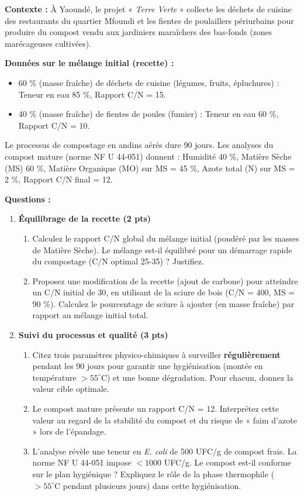 \documentclass[11pt]{article}
\begin{document}
\begin{exercice}
\textbf{Contexte :} À Yaoundé, le projet « \emph{Terre Verte} » collecte les déchets de cuisine des restaurants du quartier Mfoundi et les fientes de poulaillers périurbains pour produire du compost vendu aux jardiniers maraîchers des bas-fonds (zones marécageuses cultivées).

\textbf{Données sur le mélange initial (recette) :}
\begin{itemize}
    \item 60 \% (masse fraîche) de déchets de cuisine (légumes, fruits, épluchures) : Teneur en eau 85 \%, Rapport C/N = 15.
    \item 40 \% (masse fraîche) de fientes de poules (fumier) : Teneur en eau 60 \%, Rapport C/N = 10.
\end{itemize}
Le processus de compostage en andins aérés dure 90 jours. Les analyses du compost mature (norme NF U 44-051) donnent : Humidité 40 \%, Matière Sèche (MS) 60 \%, Matière Organique (MO) sur MS = 45 \%, Azote total (N) sur MS = 2 \%, Rapport C/N final = 12.

\textbf{Questions :}

\begin{enumerate}
    \item \textbf{Équilibrage de la recette (2 pts)}
    \begin{enumerate}
        \item Calculez le rapport C/N global du mélange initial (pondéré par les masses de Matière Sèche). Le mélange est-il équilibré pour un démarrage rapide du compostage (C/N optimal 25-35) ? Justifiez.
        \item Proposez une modification de la recette (ajout de carbone) pour atteindre un C/N initial de 30, en utilisant de la sciure de bois (C/N = 400, MS = 90 \%). Calculez le pourcentage de sciure à ajouter (en masse fraîche) par rapport au mélange initial total.
    \end{enumerate}

    \item \textbf{Suivi du processus et qualité (3 pts)}
    \begin{enumerate}
        \item Citez trois paramètres physico-chimiques à surveiller \textbf{régulièrement} pendant les 90 jours pour garantir une hygiénisation (montée en température $> 55^\circ\text{C}$) et une bonne dégradation. Pour chacun, donnez la valeur cible optimale.
        \item Le compost mature présente un rapport C/N = 12. Interprétez cette valeur au regard de la stabilité du compost et du risque de « faim d'azote » lors de l'épandage.
        \item L'analyse révèle une teneur en \emph{E. coli} de 500 UFC/g de compost frais. La norme NF U 44-051 impose $< 1000$ UFC/g. Le compost est-il conforme sur le plan hygiénique ? Expliquez le rôle de la phase thermophile ($> 55^\circ\text{C}$ pendant plusieurs jours) dans cette hygiénisation.
    \end{enumerate}


\end{enumerate}
\end{exercice}
\end{document}
